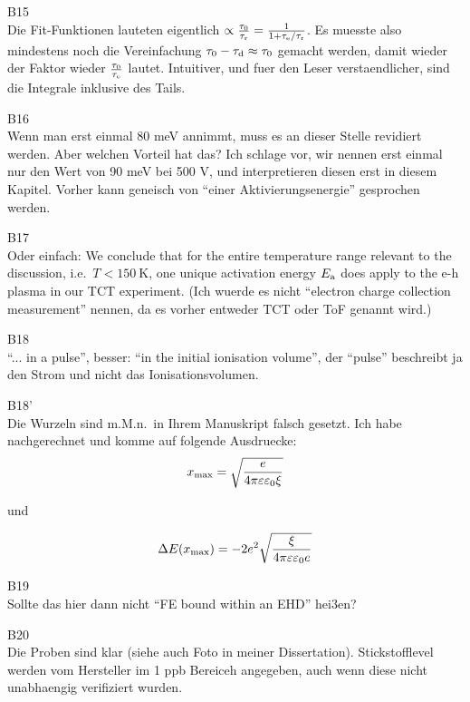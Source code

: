 B15\\
Die Fit-Funktionen lauteten eigentlich $\propto \frac{\tau_{0}}{\tau_\textrm{r}} = \frac{1}{1+\tau_\textrm{e}/\tau_\textrm{r}}$. 
Es muesste also mindestens noch die Vereinfachung $\tau_{0} - \tau_{\textrm{d}} \approx \tau_{0}$ gemacht werden, damit wieder der Faktor wieder $\frac{\tau_{0}}{\tau_\textrm{e}}$ lautet. 
Intuitiver, und fuer den Leser verstaendlicher, sind die Integrale inklusive des Tails. 

B16\\
Wenn man erst einmal 80 meV annimmt, muss es an dieser Stelle revidiert werden. 
Aber welchen Vorteil hat das? 
Ich schlage vor, wir nennen erst einmal nur den Wert von 90 meV bei 500 V, 
 und interpretieren diesen erst in diesem Kapitel. 
Vorher kann geneisch von ``einer Aktivierungsenergie'' gesprochen werden. 

B17\\
Oder einfach:
We conclude that for the entire temperature range relevant to the discussion, i.e.\ $T<\SI{150}{\kelvin}$, one unique activation energy $E_{\textrm{a}}$ does apply to the e-h plasma in our TCT experiment. 
(Ich wuerde es nicht ``electron charge collection measurement'' nennen, da es vorher entweder TCT oder ToF genannt wird.)

B18\\
``... in a pulse'', besser: ``in the initial ionisation volume'', der ``pulse'' beschreibt ja den Strom und nicht das Ionisationsvolumen. 

B18'\\
Die Wurzeln sind m.M.n.\ in Ihrem Manuskript falsch gesetzt. Ich habe nachgerechnet und komme auf folgende Ausdruecke:
\begin{equation}
 x_{\textrm{max}} = \sqrt{\frac{\mathnormal{e}}{4\pi\varepsilon\varepsilon_0 \xi}}
\end{equation}

\noindent
und

\begin{equation}
 \Delta E(x_{\textrm{max}}) = -2\mathnormal{e}^2 \sqrt{\frac{\xi}{4\pi\varepsilon\varepsilon_0 \mathnormal{e}}}
\end{equation}


B19\\
Sollte das hier dann nicht ``FE bound within an EHD'' hei3en?

B20\\
Die Proben sind klar (siehe auch Foto in meiner Dissertation). 
Stickstofflevel werden vom Hersteller im 1 ppb Bereiceh angegeben, auch wenn diese nicht unabhaengig verifiziert wurden.


